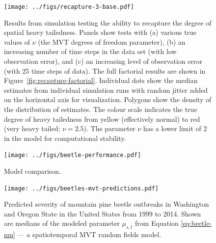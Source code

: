 \documentclass[12pt,english]{article}
\begin{document}
\begin{spacing}{1.5}
\clearpage

\begin{figure}[htb]
\begin{center}
  \texttt{[image: ../figs/recapture-3-base.pdf]}
\caption{Results from simulation testing the ability to recapture the degree
of spatial heavy tailedness. Panels show
tests with (a) various true values of $\nu$ (the MVT degrees of freedom parameter),
(b) an increasing number of time steps in the data set (with low observation error),
and (c) an increasing level of observation error (with 25 time steps of data).
The full factorial results are shown in Figure~\ref{fig:recapture-factorial}.
Individual dots show the median estimates from individual simulation runs
with random jitter added on the horizontal axis for visualization.
Polygons show the density of the distribution of estimates.
The colour scale indicates the true degree of heavy tailedness from
yellow (effectively normal) to red (very heavy tailed; $\nu = 2.5$).
The parameter $\nu$ has a lower limit of $2$ in the model
for computational stability.
}
\label{fig:recapture}
\end{center}
\end{figure}

\begin{figure}[htb]
\begin{center}
  \texttt{[image: ../figs/beetle-performance.pdf]}
\caption{
  Model comparison.
}
\label{fig:map-etc}
\end{center}
\end{figure}

\clearpage

\begin{figure}[htb]
\begin{center}
  \texttt{[image: ../figs/beetles-mvt-predictions.pdf]}
\caption{Predicted severity of mountain pine beetle outbreaks in Washington and
  Oregon State in the United States from 1999 to 2014.
  Shown are medians of the modeled parameter $\mu_{s,t}$ from Equation \ref{eq:beetle-mu}
  --- a spatiotemporal MVT random fields model.
}
\label{fig:beetle-pred}
\end{center}
\end{figure}

\clearpage




\end{spacing}
\end{document}
